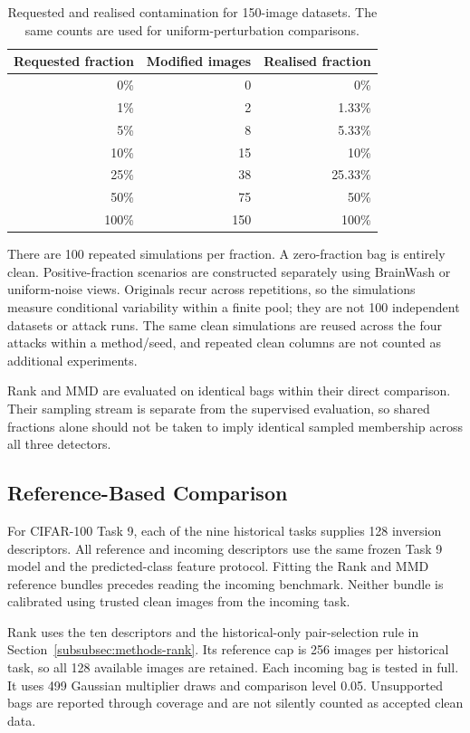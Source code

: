 \begin{table}[tbp]
\centering
\begin{tabular}{rrr}
\toprule
Requested fraction & Modified images & Realised fraction\\
\midrule
0\% & 0 & 0\%\\
1\% & 2 & 1.33\%\\
5\% & 8 & 5.33\%\\
10\% & 15 & 10\%\\
25\% & 38 & 25.33\%\\
50\% & 75 & 50\%\\
100\% & 150 & 100\%\\
\bottomrule
\end{tabular}
\caption{Requested and realised contamination for 150-image datasets. The
same counts are used for uniform-perturbation comparisons.}
\label{tab:setup-rates}
\end{table}

There are 100 repeated simulations per fraction. A zero-fraction bag is
entirely clean. Positive-fraction scenarios are constructed separately
using BrainWash or uniform-noise views. Originals recur across repetitions,
so the simulations measure conditional variability within a finite pool;
they are not 100 independent datasets or attack runs. The same clean
simulations are reused across the four attacks within a method/seed, and
repeated clean columns are not counted as additional experiments.

Rank and MMD are evaluated on identical bags within their direct
comparison. Their sampling stream is separate from the supervised
evaluation, so shared fractions alone should not be taken to imply
identical sampled membership across all three detectors.

\subsection{Reference-Based Comparison}
\label{subsec:setup-reference}

For CIFAR-100 Task 9, each of the nine historical tasks supplies 128
inversion descriptors. All reference and incoming descriptors use the
same frozen Task 9 model and the predicted-class feature protocol. Fitting
the Rank and MMD reference bundles precedes reading the incoming benchmark.
Neither bundle is calibrated using trusted clean images from the incoming
task.

Rank uses the ten descriptors and the historical-only pair-selection rule
in Section~\ref{subsubsec:methods-rank}. Its reference cap is 256 images per
historical task, so all 128 available images are retained. Each incoming
bag is tested in full. It uses 499 Gaussian multiplier draws and comparison
level 0.05. Unsupported bags are reported through coverage and are not
silently counted as accepted clean data.

